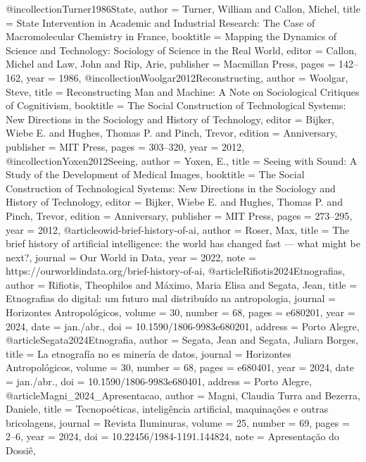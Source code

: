 @incollection{Turner1986State,
  author    = {Turner, William and Callon, Michel},
  title     = {{State Intervention in Academic and Industrial Research: The Case of Macromolecular Chemistry in France}},
  booktitle = {{Mapping the Dynamics of Science and Technology: Sociology of Science in the Real World}},
  editor    = {Callon, Michel and Law, John and Rip, Arie},
  publisher = {Macmillan Press},
  pages     = {142--162},
  year      = {1986},
}
@incollection{Woolgar2012Reconstructing,
  author    = {Woolgar, Steve},
  title     = {{Reconstructing Man and Machine: A Note on Sociological Critiques of Cognitivism}},
  booktitle = {{The Social Construction of Technological Systems: New Directions in the Sociology and History of Technology}},
  editor    = {Bijker, Wiebe E. and Hughes, Thomas P. and Pinch, Trevor},
  edition   = {Anniversary},
  publisher = {MIT Press},
  pages     = {303--320},
  year      = {2012},
}
@incollection{Yoxen2012Seeing,
  author    = {Yoxen, E.},
  title     = {{Seeing with Sound: A Study of the Development of Medical Images}},
  booktitle = {{The Social Construction of Technological Systems: New Directions in the Sociology and History of Technology}},
  editor    = {Bijker, Wiebe E. and Hughes, Thomas P. and Pinch, Trevor},
  edition   = {Anniversary},
  publisher = {MIT Press},
  pages     = {273--295},
  year      = {2012},
}
@article{owid-brief-history-of-ai,
  author  = {Roser, Max},
  title   = {The brief history of artificial intelligence: the world has changed fast — what might be next?},
  journal = {Our World in Data},
  year    = {2022},
  note    = {https://ourworldindata.org/brief-history-of-ai},
}
@article{Rifiotis2024Etnografias,
  author  = {Rifiotis, Theophilos and Máximo, Maria Elisa and Segata, Jean},
  title   = {Etnografias do digital: um futuro mal distribuído na antropologia},
  journal = {Horizontes Antropológicos},
  volume  = {30},
  number  = {68},
  pages   = {e680201},
  year    = {2024},
  date    = {jan./abr.},
  doi     = {10.1590/1806-9983e680201},
  address = {Porto Alegre},
}
@article{Segata2024Etnografia,
  author  = {Segata, Jean and Segata, Juliara Borges},
  title   = {La etnografía no es minería de datos},
  journal = {Horizontes Antropológicos},
  volume  = {30},
  number  = {68},
  pages   = {e680401},
  year    = {2024},
  date    = {jan./abr.},
  doi     = {10.1590/1806-9983e680401},
  address = {Porto Alegre},
}
@article{Magni_2024_Apresentacao,
  author  = {Magni, Claudia Turra and Bezerra, Daniele},
  title   = {Tecnopoéticas, inteligência artificial, maquinações e outras bricolagens},
  journal = {Revista Iluminuras},
  volume  = {25},
  number  = {69},
  pages   = {2--6},
  year    = {2024},
  doi     = {10.22456/1984-1191.144824},
  note    = {Apresentação do Dossiê},
}
